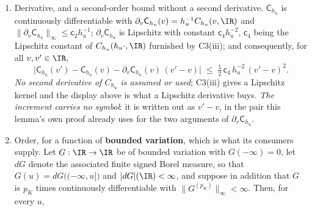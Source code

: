 \begin{lemma}
\begin{enumerate}
\item[(ii)] Derivative, and a second-order bound without a second derivative. $\mathsf C_{h_u}$
is continuously differentiable with $\partial_v\mathsf C_{h_u}(v)=h_u^{-1}C_{h_u}(v,\IR)$ and
$\|\partial_v\mathsf C_{h_u}\|_\infty\le\mathsf c_2h_u^{-1}$; $\partial_v\mathsf C_{h_u}$ is Lipschitz
with constant $\mathsf c_4h_u^{-2}$, $\mathsf c_4$ being the Lipschitz constant of
$C_{h_u}(h_u\cdot,\IR)$ furnished by C3(iii); and consequently, for all $v,v'\in\IR$,
\[
\big|\mathsf C_{h_u}(v')-\mathsf C_{h_u}(v)-\partial_v\mathsf C_{h_u}(v)\,(v'-v)\big|
\;\le\;\tfrac12\,\mathsf c_4\,h_u^{-2}\,(v'-v)^{2} .
\]
\emph{No second derivative of $C_{h_u}$ is assumed or used}; C3(iii) gives a Lipschitz kernel and the
display above is what a Lipschitz derivative buys. \emph{The increment carries no symbol}: it is written
out as $v'-v$, in the pair this lemma's own proof already uses for the two arguments of
$\partial_v\mathsf C_{h_u}$.
\item[(iii)] Order, for a function of \textbf{bounded variation}, which is what its
consumers supply. Let $G:\IR\to\IR$ be of bounded variation
with $G(-\infty)=0$, let $dG$ denote the associated finite signed Borel measure, so that
$G(u)=dG\big((-\infty,u]\big)$ and $|dG|(\IR)<\infty$, and suppose in addition that $G$ is $p_K$ times
continuously differentiable with $\|G^{(p_K)}\|_\infty<\infty$. Then, for every $u$,

\end{enumerate}
\end{lemma}
